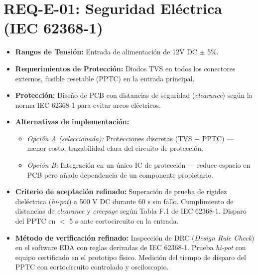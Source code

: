 \documentclass[%
	paper=a4,
	twoside=false,
	parskip=half,
	chapterprefix=false,
	10pt,
	headings=normal,
	bibliography=totoc,
	listof=totoc,
	titlepage=on,
	captions=tableabove,
	draft=false, 
]{scrbook}%
\begin{document}
\section{REQ-E-01: Seguridad Eléctrica (IEC 62368-1)}
\begin{itemize}
    \item \textbf{Rangos de Tensión:} Entrada de alimentación de 12V DC $\pm$ 5\%.
    \item \textbf{Requerimientos de Protección:} Diodos TVS en todos los conectores externos, fusible resetable (PPTC) en la entrada principal.
    \item \textbf{Protección:} Diseño de PCB con distancias de seguridad (\textit{clearance}) según la norma IEC 62368-1 para evitar arcos eléctricos.
    \item \textbf{Alternativas de implementación:}
        \begin{itemize}
            \item \textit{Opción A (seleccionada):} Protecciones discretas (TVS + PPTC) — menor costo, trazabilidad clara del circuito de protección.
            \item \textit{Opción B:} Integración en un único IC de protección — reduce espacio en PCB pero añade dependencia de un componente propietario.
        \end{itemize}
    \item \textbf{Criterio de aceptación refinado:} Superación de prueba de rigidez dieléctrica (\textit{hi-pot}) a 500 V DC durante 60 s sin fallo. Cumplimiento de distancias de \textit{clearance} y \textit{creepage} según Tabla F.1 de IEC 62368-1. Disparo del PPTC en $<$ 5 s ante cortocircuito en la entrada.
    \item \textbf{Método de verificación refinado:} Inspección de DRC (\textit{Design Rule Check}) en el software EDA con reglas derivadas de IEC 62368-1. Prueba \textit{hi-pot} con equipo certificado en el prototipo físico. Medición del tiempo de disparo del PPTC con cortocircuito controlado y osciloscopio.
\end{itemize}

\end{document}
